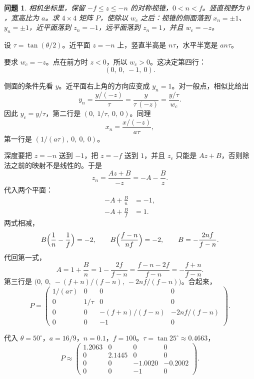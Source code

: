 \documentclass[12pt,a4paper]{article}
\theoremstyle{definition}
\theoremstyle{plain}
\newtheorem{problem}{问题}[section]
\theoremstyle{remark}
\begin{document}
\begin{problem}
相机坐标里，保留 $-f\le z\le -n$ 的对称视锥，$0<n<f$。竖直视野为 $\theta$，宽高比为 $a$。求 $4\times 4$ 矩阵 $P$，使除以 $w_c$ 之后：视锥的侧面落到 $x_n=\pm 1$、$y_n=\pm 1$，近平面落到 $z_n=-1$，远平面落到 $z_n=1$，并且 $w_c=-z$。
\end{problem}

设 $\tau=\tan(\theta/2)$。近平面 $z=-n$ 上，竖直半高是 $n\tau$，水平半宽是 $an\tau$。

要求 $w_c=-z$。点在前方时 $z<0$，所以 $w_c>0$。这决定第四行：
\[
(0,\ 0,\ -1,\ 0).
\]

侧面的条件先看 $y$。近平面右上角的方向应变成 $y_n=1$。对一般点，相似比给出
\[
y_n=\frac{y/(-z)}{\tau}=\frac{y}{\tau\,(-z)}=\frac{y/\tau}{w_c}.
\]
因此 $y_c=y/\tau$，第二行是 $(0,\ 1/\tau,\ 0,\ 0)$。同理
\[
x_n=\frac{x/(-z)}{a\tau},
\]
第一行是 $(1/(a\tau),\ 0,\ 0,\ 0)$。

深度要把 $z=-n$ 送到 $-1$，把 $z=-f$ 送到 $1$，并且 $z_c$ 只能是 $Az+B$，否则除法之前的映射不是线性的。于是
\[
z_n=\frac{Az+B}{-z}=-A-\frac{B}{z}.
\]
代入两个平面：
\begin{align*}
-A+\frac{B}{n}&=-1,\\
-A+\frac{B}{f}&=1.
\end{align*}
两式相减，
\[
B\Bigl(\frac{1}{n}-\frac{1}{f}\Bigr)=-2,
\qquad
B\Bigl(\frac{f-n}{nf}\Bigr)=-2,
\qquad
B=-\frac{2nf}{f-n}.
\]
代回第一式，
\[
A=1+\frac{B}{n}
=1-\frac{2f}{f-n}
=\frac{f-n-2f}{f-n}
=-\frac{f+n}{f-n}.
\]
第三行是 $\bigl(0,\ 0,\ -(f+n)/(f-n),\ -2nf/(f-n)\bigr)$。合起来，
\begin{equation}
P=
\begin{pmatrix}
1/(a\tau)&0&0&0\\
0&1/\tau&0&0\\
0&0&-(f+n)/(f-n)&-2nf/(f-n)\\
0&0&-1&0
\end{pmatrix}.
\label{eq:persp}
\end{equation}

代入 $\theta=50^\circ$，$a=16/9$，$n=0.1$，$f=100$。$\tau=\tan 25^\circ\approx 0.4663$，
\begin{equation}
P\approx
\begin{pmatrix}
1.2063&0&0&0\\
0&2.1445&0&0\\
0&0&-1.0020&-0.2002\\
0&0&-1&0
\end{pmatrix}.
\label{eq:persp-num}
\end{equation}
\end{document}
